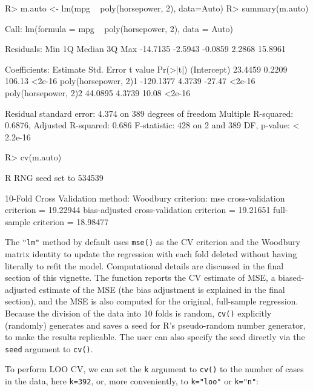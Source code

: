 \documentclass[
]{jss}
\begin{document}
\begin{CodeChunk}
\begin{CodeInput}
R> m.auto <- lm(mpg ~ poly(horsepower, 2), data=Auto)
R> summary(m.auto)
\end{CodeInput}
\begin{CodeOutput}

Call:
lm(formula = mpg ~ poly(horsepower, 2), data = Auto)

Residuals:
     Min       1Q   Median       3Q      Max 
-14.7135  -2.5943  -0.0859   2.2868  15.8961 

Coefficients:
                      Estimate Std. Error t value Pr(>|t|)
(Intercept)            23.4459     0.2209  106.13   <2e-16
poly(horsepower, 2)1 -120.1377     4.3739  -27.47   <2e-16
poly(horsepower, 2)2   44.0895     4.3739   10.08   <2e-16

Residual standard error: 4.374 on 389 degrees of freedom
Multiple R-squared:  0.6876,    Adjusted R-squared:  0.686 
F-statistic:   428 on 2 and 389 DF,  p-value: < 2.2e-16
\end{CodeOutput}
\begin{CodeInput}
R> cv(m.auto)
\end{CodeInput}
\begin{CodeOutput}
R RNG seed set to 534539
\end{CodeOutput}
\begin{CodeOutput}
10-Fold Cross Validation
method: Woodbury
criterion: mse
cross-validation criterion = 19.22944
bias-adjusted cross-validation criterion = 19.21651
full-sample criterion = 18.98477 
\end{CodeOutput}
\end{CodeChunk}

The \texttt{"lm"} method by default uses \texttt{mse()} as the CV
criterion and the Woodbury matrix identity to update the regression with
each fold deleted without having literally to refit the model.
Computational details are discussed in the final section of this
vignette. The function reports the CV estimate of MSE, a biased-adjusted
estimate of the MSE (the bias adjustment is explained in the final
section), and the MSE is also computed for the original, full-sample
regression. Because the division of the data into 10 folds is random,
\texttt{cv()} explicitly (randomly) generates and saves a seed for R's
pseudo-random number generator, to make the results replicable. The user
can also specify the seed directly via the \texttt{seed} argument to
\texttt{cv()}.

To perform LOO CV, we can set the \texttt{k} argument to \texttt{cv()}
to the number of cases in the data, here \texttt{k=392}, or, more
conveniently, to \texttt{k="loo"} or \texttt{k="n"}:
\end{document}
